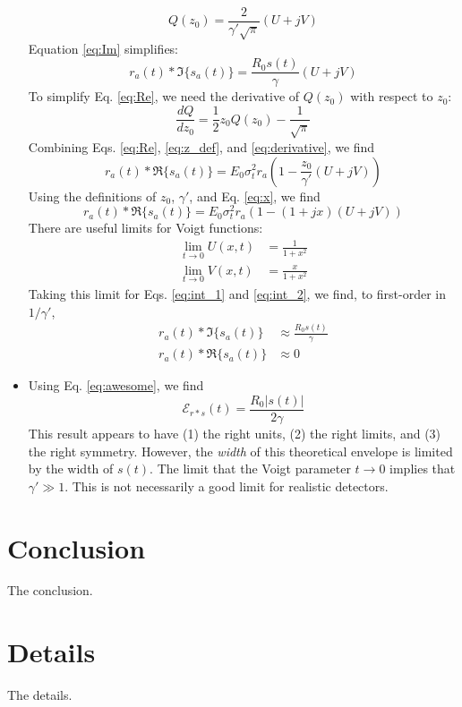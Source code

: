 \documentclass[amsmath,amssymb,aps,prd,10pt,twocolumn,showkeys]{revtex4}
\begin{document}
\begin{itemize}
\begin{equation}
Q(z_0) = \frac{2}{\gamma'\sqrt{\pi}}\left(U + j V\right)
\end{equation}
Equation \ref{eq:Im} simplifies:
\begin{equation}
\boxed{r_a(t) * \Im\lbrace s_a(t)\rbrace = \frac{R_0 s(t)}{\gamma} \left(U + j V \right)} \label{eq:int_1}
\end{equation}
To simplify Eq. \ref{eq:Re}, we need the derivative of $Q(z_0)$ with respect to $z_0$:
\begin{equation}
\frac{dQ}{dz_0} = \frac{1}{2}z_0 Q(z_0) - \frac{1}{\sqrt{\pi}} \label{eq:derivative}
\end{equation}
Combining Eqs. \ref{eq:Re}, \ref{eq:z_def}, and \ref{eq:derivative}, we find
\begin{equation}
r_a(t) * \Re\lbrace s_a(t)\rbrace = E_0 \sigma_t^2 r_a \left(1 - \frac{z_0}{\gamma'}\left(U + j V \right)\right)
\end{equation}
Using the definitions of $z_0$, $\gamma'$, and Eq. \ref{eq:x}, we find
\begin{equation}
\boxed{r_a(t) * \Re\lbrace s_a(t)\rbrace = E_0 \sigma_t^2 r_a \left(1 - \left(1 + j x \right)\left(U + j V \right)\right)} \label{eq:int_2}
\end{equation}
There are useful limits for Voigt functions:
\begin{align}
\lim_{t\to 0} U(x,t) &= \frac{1}{1+x^2} \\
\lim_{t\to 0} V(x,t) &= \frac{x}{1+x^2}
\end{align}
Taking this limit for Eqs. \ref{eq:int_1} and \ref{eq:int_2}, we find, to first-order in $1/\gamma'$, 
\begin{align}
r_a(t) * \Im\lbrace s_a(t)\rbrace &\approx \frac{R_0s(t)}{\gamma} \\
r_a(t) * \Re\lbrace s_a(t)\rbrace &\approx 0
\end{align}
\item 
Using Eq. \ref{eq:awesome}, we find
\begin{equation}
\boxed{\mathcal{E}_{r * s}(t) = \frac{R_0|s(t)|}{2\gamma}}
\end{equation}
This result appears to have (1) the right units, (2) the right limits, and (3) the right symmetry.  However, the \textit{width} of this theoretical envelope is limited by the width of $s(t)$.  The limit that the Voigt parameter $t \to 0$ implies that $\gamma' \gg 1$.  This is not necessarily a good limit for realistic detectors.
\end{itemize}

\section{Conclusion}
\label{sec:conc}

The conclusion.

\appendix

\section{Details}
\label{app:a}

The details.


\end{document}
